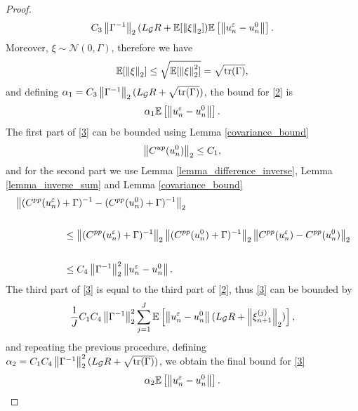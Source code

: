 \documentclass[10pt]{article}
\begin{document}
\begin{proof}
\begin{equation*}
C_3 \left\|\Gamma^{-1}\right\|_2 (L_{\mathcal{G}} R + \mathbb{E} [\left\|\xi\right\|_2]) \mathbb{E} \left [ \left\|u_n^{\varepsilon} - u_n^0\right\| \right ].
\end{equation*}
Moreover, $\xi \sim \mathcal{N}(0,\Gamma)$, therefore we have
\begin{equation*}
\mathbb{E}[\left\|\xi\right\|_2] \le \sqrt{\mathbb{E}[\left\|\xi\right\|_2^2]} = \sqrt{\mathrm{tr}(\Gamma)},
\end{equation*}
and defining $\alpha_1 = C_3 \left\|\Gamma^{-1}\right\|_2 (L_{\mathcal{G}} R + \sqrt{\mathrm{tr}(\Gamma)})$, the bound for \eqref{2} is
\begin{equation}
\label{bound2}
\alpha_1 \mathbb{E} \left [ \left\|u_n^{\varepsilon} - u_n^0\right\| \right ].
\end{equation}
The first part of \eqref{3} can be bounded using Lemma \ref{covariance_bound} 
\begin{equation*}
\left\|C^{up}(u_n^0)\right\|_2 \le C_1,
\end{equation*}
and for the second part we use Lemma \ref{lemma_difference_inverse}, Lemma \ref{lemma_inverse_sum} and Lemma \ref{covariance_bound}
\begin{align*}
& \left\|(C^{pp}(u_n^{\varepsilon}) + \Gamma)^{-1} - (C^{pp}(u_n^0) + \Gamma)^{-1}\right\|_2 \\ \\
& \hspace{50pt} \le \left\|(C^{pp}(u_n^{\varepsilon}) + \Gamma)^{-1}\right\|_2 \left\|(C^{pp}(u_n^0) + \Gamma)^{-1}\right\|_2 \left\|C^{pp}(u_n^{\varepsilon}) - C^{pp}(u_n^0)\right\|_2 \\ \\
& \hspace{50pt} \le C_4 \left\|\Gamma^{-1}\right\|_2^2  \left\|u_n^{\varepsilon} - u_n^0\right\|.
\end{align*}
The third part of \eqref{3} is equal to the third part of \eqref{2}, thus \eqref{3} can be bounded by
\begin{equation*}
\frac{1}{J} C_1 C_4 \left\|\Gamma^{-1}\right\|_2^2 \sum_{j=1}^J \mathbb{E} \left [ \left\|u_n^{\varepsilon} - u_n^0\right\| (L_{\mathcal{G}} R + \left\|\xi_{n+1}^{(j)}\right\|_2) \right ],
\end{equation*}
and repeating the previous procedure, defining $\alpha_2 = C_1 C_4 \left\|\Gamma^{-1}\right\|_2^2 (L_{\mathcal{G}} R + \sqrt{\mathrm{tr}(\Gamma)})$, we obtain the final bound for \eqref{3}
\begin{equation}
\label{bound3}
\alpha_2 \mathbb{E} \left [ \left\|u_n^{\varepsilon} - u_n^0\right\| \right ].
\end{equation}

\end{proof}
\end{document}
